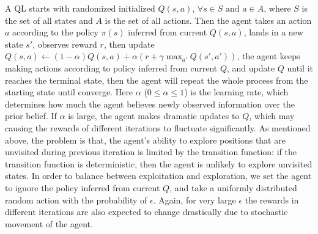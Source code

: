 \documentclass[10pt]{article}
\begin{document}
A QL starts with randomized initialized $Q(s,a) \text{,  } \forall s\in S \text{  and  } a \in A$,  where $S$ is the set of all states and $A$ is the set of all actions. Then the agent takes an action $a$ according to the policy $\pi(s)$ inferred from current $Q(s,a)$, lands in a new state $s'$, observes reward $r$, then update $Q(s,a) \gets (1-\alpha)Q(s,a)+\alpha (r+\gamma \max_{a'}Q(s',a'))$, the agent keeps making actions according to policy inferred from current $Q$, and update $Q$ until it reaches the terminal state, then the agent will repeat the whole process from the starting state until converge. Here $\alpha$ ($0\leqslant\alpha\leqslant1$) is the learning rate, which determines how much the agent believes newly observed information over the prior belief. If $\alpha$ is large, the agent makes dramatic updates to $Q$, which may causing the rewards of different iterations to fluctuate significantly. As mentioned above, the problem is that, the agent's ability to explore positions that are unvisited during previous iteration is limited by the transition function: if the transition function is deterministic, then the agent is unlikely to explore unvisited states. In order to balance between exploitation and exploration, we set the agent to ignore the policy inferred from current $Q$, and take a uniformly distributed random action with the probability of $\epsilon$. Again, for very large $\epsilon$ the rewards in different iterations are also expected to change drastically due to stochastic movement of the agent.\par



\end{document}

